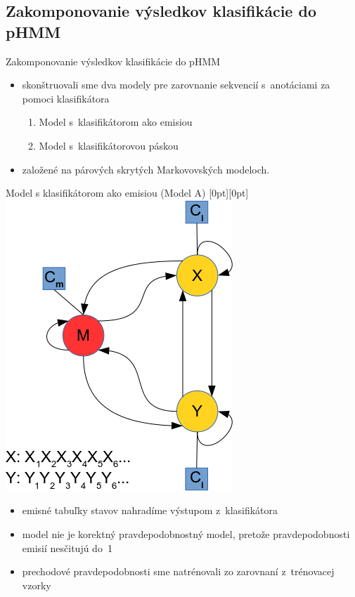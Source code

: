 \documentclass[xcolor=dvipsnames, compress, 12pt]{beamer}
\newcommand{\lenitem}[2][.6\linewidth]{\parbox[t]{#1}{\strut #2\strut}}
\theoremstyle{definition}
\begin{document}
\subsection{Zakomponovanie výsledkov klasifikácie do pHMM}
\begin{frame}{Zakomponovanie výsledkov klasifikácie do pHMM}

\begin{itemize}
  \item skonštruovali sme dva modely pre zarovnanie sekvencií s~anotáciami za pomoci klasifikátora
  \begin{enumerate}
    \item Model s~klasifikátorom ako emisiou
    \item Model s~klasifikátorovou páskou
  \end{enumerate}
  \item založené na párových skrytých Markovovských modeloch.
\end{itemize}

\end{frame}

\begin{frame}{Model s klasifikátorom ako emisiou (Model A)}
  \mbox{}\hfill\raisebox{-\height}[0pt][0pt]{
   \includegraphics[width=.30\textwidth]{images/zakladny_model}
   }
  \vspace*{-\baselineskip}

  \begin{itemize}
    \item \lenitem{emisné tabuľky stavov nahradíme výstupom z~klasifikátora}
    \item \lenitem{model nie je korektný pravdepodobnostný model, pretože pravdepodobnosti emisií nesčitujú do~1}
    \item \lenitem{prechodové pravdepodobnosti sme natrénovali zo zarovnaní z~trénovacej vzorky}
  \end{itemize}
\end{frame}

\end{document}
